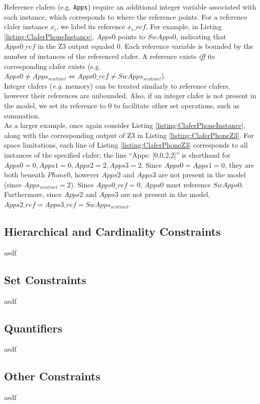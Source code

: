 \documentclass{easychair}
\newcommand{\eg}{\emph{e.g.}\xspace}
\begin{document}
\indent Reference clafers (e.g. \texttt{Apps}) require an additional integer variable associated with each instance, which corresponds to where the reference points. For a reference clafer instance $x_i$, we label its reference $x_i\_ref$. For example, in Listing \ref{listing:ClaferPhoneInstance}, $Apps0$ points to $SwApps0$, indicating that $Apps0\_ref$ in the Z3 output equaled 0. Each reference variable is bounded by the number of instances of the referenced clafer. A reference exists \textit{iff} its corresponding clafer exists (e.g. $Apps0 \ne Apps_{sentinel} \Leftrightarrow Apps0\_ref \ne SwApps_{sentinel}$). \\
\indent Integer clafers (\eg memory) can be treated similarly to reference clafers, however their references are unbounded. Also, if an integer clafer is not present in the model, we set its reference to 0 to facilitate other set operations, such as summation. \\
\indent As a larger example, once again consider Listing \ref{listing:ClaferPhoneInstance}, along with the corresponding output of Z3 in Listing \ref{listing:ClaferPhoneZ3}. For space limitations, each line of Listing \ref{listing:ClaferPhoneZ3} corresponds to all instances of the specified clafer; the line ``Apps: [0,0,2,2]'' is shorthand for $Apps0 = 0, Apps1 = 0, Apps2 = 2, Apps3 = 2$. Since $Apps0 = Apps1 = 0$, they are both beneath $Phone0$, however $Apps2$ and $Apps3$ are not present in the model (since $Apps_{sentinel} = 2$). Since $Apps0\_ref = 0$, $Apps0$ must reference $SwApps0$. Furthermore, since $Apps2$ and $Apps3$ are not present in the model, $Apps2\_ref = Apps3\_ref = SwApps_{sentinel}$.

\subsection{Hierarchical and Cardinality Constraints}
asdf
\subsection{Set Constraints}
asdf
\subsection{Quantifiers}
asdf
\subsection{Other Constraints}
asdf
\end{document}
